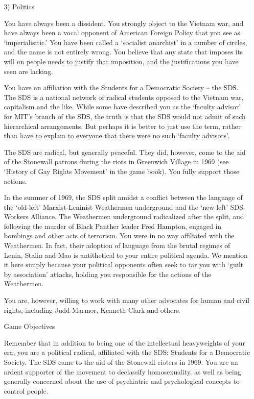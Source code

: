\begin{refsection}
3) Politics

You have always been a dissident. You strongly object to the Vietnam war, and have always been a vocal opponent of American Foreign Policy that you see as `imperialisitic.' You have been called a `socialist anarchist' in a number of circles, and the name is not entirely wrong. You believe that any state that imposes its will on people needs to justify that imposition, and the justifications you have seen are lacking.

You have an affiliation with the Students for a Democratic Society – the SDS. The SDS is a national network of radical students opposed to the Vietnam war, capitalism and the like. While some have described you as the `faculty advisor' for MIT's branch of the SDS, the truth is that the SDS would not admit of such hierarchical arrangements. But perhaps it is better to just use the term, rather than have to explain to everyone that there were no such `faculty advisors'.

The SDS are radical, but generally peaceful. They did, however, come to the aid of the Stonewall patrons during the riots in Greenwich Village in 1969 (see `History of Gay Rights Movement' in the game book). You fully support those actions.

In the summer of 1969, the SDS split amidst a conflict between the language of the `old-left' Marxist-Leninist Weathermen underground and the `new left' SDS-Workers Alliance. The Weathermen underground radicalized after the split, and following the murder of Black Panther leader Fred Hampton, engaged in bombings and other acts of terrorism. You were in no way affiliated with the Weathermen. In fact, their adoption of language from the brutal regimes of Lenin, Stalin and Mao is antithetical to your entire political agenda. We mention it here simply because your political opponents often seek to tar you with `guilt by association' attacks, holding you responsible for the actions of the Weathermen.

You are, however, willing to work with many other advocates for human and civil rights, including Judd Marmor, Kenneth Clark and others.

Game Objectives

Remember that in addition to being one of the intellectual heavyweights of your era, you are a political radical, affiliated with the SDS: Students for a Democratic Society. The SDS came to the aid of the Stonewall rioters in 1969. You are an ardent supporter of the movement to declassify homosexuality, as well as being generally concerned about the use of psychiatric and psychological concepts to control people.


\end{refsection}
